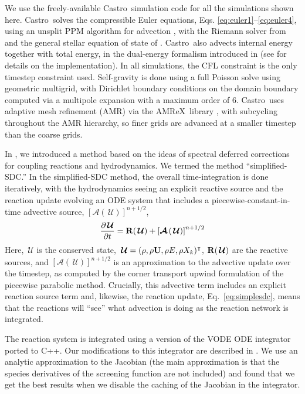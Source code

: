 \documentclass[preprint,linenumbers]{aastex631}
\newcommand{\Ub}{{\bf{U}}}
\newcommand{\castro}{{\sf Castro}}
\newcommand{\amrex}{{\sf AMReX}}
\newcommand{\ddt}[1]{{\frac{{\partial#1}}{\partial t}}}
\newcommand{\Uc}{{\,\bm{\mathcal{U}}}}
\newcommand{\Rb}{{\bf R}}
\newcommand{\Adv}[1]{{\left [\boldsymbol{\mathcal{A}} \left(#1\right)\right]}}
\begin{document}
We use the freely-available \castro\ simulation code for all the
simulations shown here.  
\castro\ solves the compressible Euler equations, Eqs. \ref{eq:euler1}--\ref{eq:euler4}, using an unsplit PPM algorithm for advection \citep{ppmunsplit,millercolella:2002,ppm}, with
the Riemann solver from \citet{colellaglaz:1985} and the general
stellar equation of state of \citet{timmes_swesty:2000}.  \castro\ also advects
internal energy together with total energy, in the dual-energy formalism introduced in \citet{bryan:1995} (see \citealt{wdmergerI} for details on the implementation).  In
all simulations, the CFL constraint is the
only timestep constraint used.  Self-gravity is done using a full
Poisson solve using geometric multigrid, with Dirichlet boundary
conditions on the domain boundary computed via a multipole expansion
with a maximum order of 6.  \castro\ uses adaptive mesh refinement (AMR) via the \amrex\ library
\citep{amrex_joss}, with 
subcycling throughout the AMR hierarchy, so finer grids are advanced at a smaller timestep than the
coarse grids.  

In \citet{castro_simple_sdc}, we introduced a method based on the
ideas of spectral deferred corrections \citep{dutt:2000, bourlioux:2003} for coupling reactions and
hydrodynamics.  We termed the method ``simplified-SDC.''  In
the simplified-SDC method, the overall
time-integration is done iteratively, with the hydrodynamics seeing an
explicit reactive source and the reaction update evolving an ODE
system that includes a piecewise-constant-in-time advective source,
$\Adv{\Uc}^{n+1/2}$,
\begin{equation}
\label{eq:simplesdc}
\ddt{\Uc} = \Rb(\Uc) + \Adv{\Uc}^{n+1/2}
\end{equation}
Here, $\Uc$ is the conserved state, $\Uc = (\rho, \rho \Ub, \rho E,
\rho X_k)^\intercal$, $\Rb(\Uc)$ are the reactive sources, and
$\Adv{\Uc}^{n+1/2}$ is an approximation to the advective update over
the timestep, as computed by the corner transport upwind formulation
of the piecewise parabolic method. Crucially, this advective
term includes an explicit reaction source term and, likewise, the reaction update,
Eq.~\ref{eq:simplesdc}, means that the reactions will ``see'' what
advection is doing as the reaction network is integrated.

The reaction system is integrated using a version of the VODE ODE
integrator \citep{vode} ported to C++.  Our modifications to this
integrator are described in \citet{castro_simple_sdc}.  We use an
analytic approximation to the Jacobian (the main approximation is that
the species derivatives of the screening function are not included)
and found that we get the best results when we disable the caching of the
Jacobian in the integrator.
\end{document}
